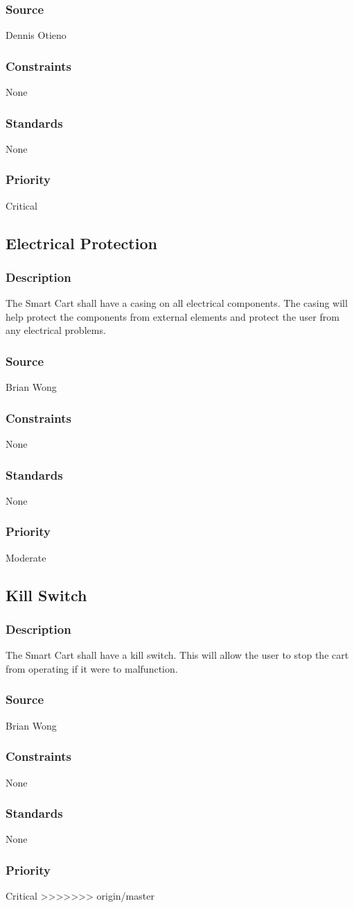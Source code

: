 \subsubsection{Source}
Dennis Otieno
\subsubsection{Constraints}
None
\subsubsection{Standards}
None
\subsubsection{Priority}
Critical


\subsection{Electrical Protection}
\subsubsection{Description}
The Smart Cart shall have a casing on all electrical components. The casing will help protect the components from external elements and protect the user from any electrical problems.
\subsubsection{Source}
Brian Wong
\subsubsection{Constraints}
None
\subsubsection{Standards}
None
\subsubsection{Priority}
Moderate


\subsection{Kill Switch}
\subsubsection{Description}
The Smart Cart shall have a kill switch. This will allow the user to stop the cart from operating if it were to malfunction.
\subsubsection{Source}
Brian Wong
\subsubsection{Constraints}
None
\subsubsection{Standards}
None
\subsubsection{Priority}
Critical
>>>>>>> origin/master

